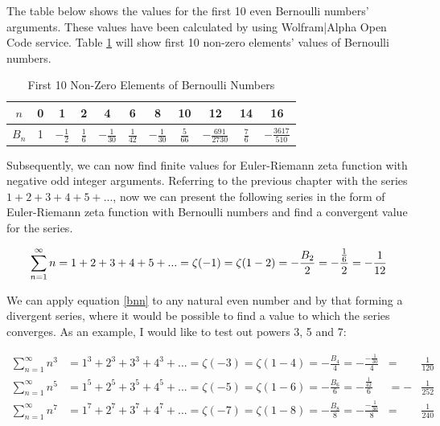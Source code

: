 \documentclass{beamer}
\begin{document}
The table below shows the values for the first 10 even Bernoulli numbers' arguments. These values
have been calculated by using Wolfram|Alpha Open Code service. Table \ref{tab:bernoulli} will show
first 10 non-zero elements' values of Bernoulli numbers.

\begin{table}[h!]
  \begin{center}
    \begin{tabular}{c | c | c | c | c | c | c | c | c | c | c}
      $n$ & 0 & 1 & 2 & 4 & 6 & 8 & 10 & 12 & 14 & 16\\
      \hline
      $B_n$ & 1 & $-\frac{1}{2}$ & $\frac{1}{6}$ & $-\frac{1}{30}$
      & $\frac{1}{42}$ & $-\frac{1}{30}$ & $\frac{5}{66}$ & $-\frac{691}{2730}$
      & $\frac{7}{6}$ & $-\frac{3617}{510}$\\
    \end{tabular}
    \caption{First 10 Non-Zero Elements of Bernoulli Numbers}
    \label{tab:bernoulli}
  \end{center}
 \end{table}

Subsequently, we can now find finite values for Euler-Riemann zeta function with negative odd
integer arguments. Referring to the previous chapter with the series $1+2+3+4+5+...$, now
we can present the following series in the form of Euler-Riemann zeta function with Bernoulli
numbers and find a convergent value for the series.

\begin{equation}
  \sum_{n=1}^{\infty} n = 1+2+3+4+5+...=\zeta(-1)=\zeta(1-2)=-\frac{B_2}{2}=
  -\frac{\frac{1}{6}}{2}=-\frac{1}{12}\\
  \end{equation}

We can apply equation \ref{bnn} to any natural even number and by that forming a divergent series,
where it would be possible to find a value to which the series converges. As an example, I would like
to test out powers 3, 5 and 7:

\begin{align*}
  \sum_{n=1}^{\infty}n^3&=1^3+2^3+3^3+4^3+...=\zeta(-3)=\zeta(1-4)=
  -\frac{B_4}{4}=-\frac{-\frac{1}{30}}{4}&=&\frac{1}{120}\\
  \sum_{n=1}^{\infty}n^5&=1^5+2^5+3^5+4^5+...=\zeta(-5)=\zeta(1-6)=
  -\frac{B_6}{6}=-\frac{\frac{1}{42}}{6}&=-&\frac{1}{252}\\
  \sum_{n=1}^{\infty}n^7&=1^7+2^7+3^7+4^7+...=\zeta(-7)=\zeta(1-8)=
  -\frac{B_8}{8}=-\frac{-\frac{1}{30}}{8}&=&\frac{1}{240}\\
\end{align*}
\end{document}
